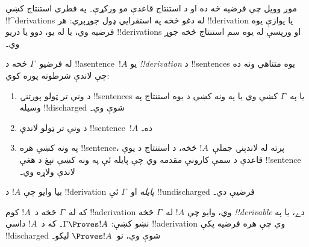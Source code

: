 \documentclass[../../../include/open-logic-section]{subfiles}
\begin{document}
      {}
      {}


\begin{explain}
موږ وويل چې فرضيه څه ده او د استنتاج قاعدې مو ورکړې۔ په فطري
استنتاج کښې !!^{derivation}s له دغو څخه په استقرايي ډول جوړېږي: هر
!!{derivation} يا يوازې يوه فرضيه وي، يا له يو، دوو يا دريو
!!{derivation}s او ورپسې له يوه سم استنتاج څخه جوړ وي۔
\end{explain}

\begin{defn}[!!^{derivation}]
 له فرضيو~$\Gamma$ څخه د !!a{sentence}~$!A$ يو \emph{!!{derivation}}
د !!{sentence}s يوه متناهي ونه ده چې لاندې شرطونه پوره کوي:
\begin{enumerate}
\item د ونې تر ټولو پورتنۍ !!{sentence}s يا په~$\Gamma$ کښې وي يا
  په ونه کښې د يوه استنتاج په وسيله !!{discharged} شوې وي۔
\item د ونې تر ټولو لاندې !!{sentence}~$!A$ ده۔
\item په ونه کښې هره !!{sentence}، پرته له لاندېنۍ جملې~$!A$
  څخه، د استنتاج د يوې قاعدې د سمې کارونې مقدمه وي چې پايله ئې په
  ونه کښې نېغ د هغې !!{sentence} لاندې ولاړه وي۔
\end{enumerate}
بيا وايو چې $!A$ د !!{derivation} \emph{پايله} او~$\Gamma$ ئې
!!{undischarged} فرضيې دي۔

که له~$\Gamma$ څخه د~$!A$ کوم !!a{derivation} وي، وايو چې $!A$
له~$\Gamma$ څخه \emph{!!{derivable}} دے، يا په نښو کښې:
$\Gamma \Proves !A$۔ که د~$!A$ داسې !!a{derivation} وي چې هره
فرضيه پکې !!{discharged} شوې وي، نو~$\Proves !A$ ليکو۔
\end{defn}
\end{document}

